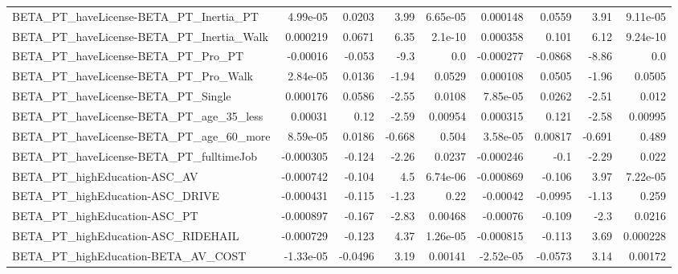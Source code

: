 \begin{tabular}{lrrrrrrrr}
BETA\_PT\_haveLicense-BETA\_PT\_Inertia\_PT             &    4.99e-05 &       0.0203 &     3.99 & 6.65e-05 &   0.000148 &      0.0559 &         3.91 &      9.11e-05 \\
BETA\_PT\_haveLicense-BETA\_PT\_Inertia\_Walk           &    0.000219 &       0.0671 &     6.35 &  2.1e-10 &   0.000358 &       0.101 &         6.12 &      9.24e-10 \\
BETA\_PT\_haveLicense-BETA\_PT\_Pro\_PT                 &    -0.00016 &       -0.053 &     -9.3 &      0.0 &  -0.000277 &     -0.0868 &        -8.86 &           0.0 \\
BETA\_PT\_haveLicense-BETA\_PT\_Pro\_Walk               &    2.84e-05 &       0.0136 &    -1.94 &   0.0529 &   0.000108 &      0.0505 &        -1.96 &        0.0505 \\
BETA\_PT\_haveLicense-BETA\_PT\_Single                 &    0.000176 &       0.0586 &    -2.55 &   0.0108 &   7.85e-05 &      0.0262 &        -2.51 &         0.012 \\
BETA\_PT\_haveLicense-BETA\_PT\_age\_35\_less            &     0.00031 &         0.12 &    -2.59 &  0.00954 &   0.000315 &       0.121 &        -2.58 &       0.00995 \\
BETA\_PT\_haveLicense-BETA\_PT\_age\_60\_more            &    8.59e-05 &       0.0186 &   -0.668 &    0.504 &   3.58e-05 &     0.00817 &       -0.691 &         0.489 \\
BETA\_PT\_haveLicense-BETA\_PT\_fulltimeJob            &   -0.000305 &       -0.124 &    -2.26 &   0.0237 &  -0.000246 &        -0.1 &        -2.29 &         0.022 \\
BETA\_PT\_highEducation-ASC\_AV                       &   -0.000742 &       -0.104 &      4.5 & 6.74e-06 &  -0.000869 &      -0.106 &         3.97 &      7.22e-05 \\
BETA\_PT\_highEducation-ASC\_DRIVE                    &   -0.000431 &       -0.115 &    -1.23 &     0.22 &   -0.00042 &     -0.0995 &        -1.13 &         0.259 \\
BETA\_PT\_highEducation-ASC\_PT                       &   -0.000897 &       -0.167 &    -2.83 &  0.00468 &   -0.00076 &      -0.109 &         -2.3 &        0.0216 \\
BETA\_PT\_highEducation-ASC\_RIDEHAIL                 &   -0.000729 &       -0.123 &     4.37 & 1.26e-05 &  -0.000815 &      -0.113 &         3.69 &      0.000228 \\
BETA\_PT\_highEducation-BETA\_AV\_COST                 &   -1.33e-05 &      -0.0496 &     3.19 &  0.00141 &  -2.52e-05 &     -0.0573 &         3.14 &       0.00172 \\

\end{tabular}
